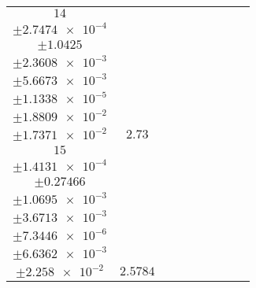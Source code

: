 \documentclass[8pt]{article}
\begin{document}
\begin{longtable}[l]{c c c c c c c c c}
$\num{14}$ & \begin{tabular}[c]{@{}c@{}}$\num{3.1712e-2}$ \\ $\pm\num{2.7474e-4}$\end{tabular} & \begin{tabular}[c]{@{}c@{}}$\num{-1.1494}$ \\ $\pm\num{1.0425}$\end{tabular} & \begin{tabular}[c]{@{}c@{}}$\num{-6.8113}$ \\ $\pm\num{2.3608e-3}$\end{tabular} & \begin{tabular}[c]{@{}c@{}}$\num{1.6026e+3}$ \\ $\pm\num{5.6673e-3}$\end{tabular} & \begin{tabular}[c]{@{}c@{}}$\num{3.2062}$ \\ $\pm\num{1.1338e-5}$\end{tabular} & \begin{tabular}[c]{@{}c@{}}$\num{1.2125}$ \\ $\pm\num{1.8809e-2}$\end{tabular} & \begin{tabular}[c]{@{}c@{}}$\num{4.1021}$ \\ $\pm\num{1.7371e-2}$\end{tabular} & $\num{2.73}$\\
$\num{15}$ & \begin{tabular}[c]{@{}c@{}}$\num{3.0049e-2}$ \\ $\pm\num{1.4131e-4}$\end{tabular} & \begin{tabular}[c]{@{}c@{}}$\num{-0.60637}$ \\ $\pm\num{0.27466}$\end{tabular} & \begin{tabular}[c]{@{}c@{}}$\num{-2.5869}$ \\ $\pm\num{1.0695e-3}$\end{tabular} & \begin{tabular}[c]{@{}c@{}}$\num{1.6068e+3}$ \\ $\pm\num{3.6713e-3}$\end{tabular} & \begin{tabular}[c]{@{}c@{}}$\num{3.2145}$ \\ $\pm\num{7.3446e-6}$\end{tabular} & \begin{tabular}[c]{@{}c@{}}$\num{1.1616}$ \\ $\pm\num{6.6362e-3}$\end{tabular} & \begin{tabular}[c]{@{}c@{}}$\num{4.165}$ \\ $\pm\num{2.258e-2}$\end{tabular} & $\num{2.5784}$\\

\end{longtable}
\end{document}
